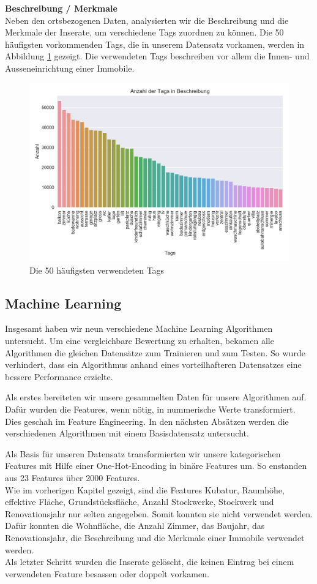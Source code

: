 \textbf{Beschreibung / Merkmale}\\
Neben den ortsbezogenen Daten, analysierten wir die Beschreibung und die Merkmale der Inserate, um verschiedene Tags zuordnen zu können. Die 50 häufigsten vorkommenden Tags, die in unserem Datensatz vorkamen, werden in Abbildung \ref{fig:tags} gezeigt. Die verwendeten Tags beschreiben vor allem die Innen- und Ausseneinrichtung einer Immobile.
%
\begin{figure}[ht]
\centering
\includegraphics[width=\textwidth]{images/tags.png}
\caption[Die 50 häufigsten verwendeten Tags]{Die 50 häufigsten verwendeten Tags}%
\label{fig:tags}
\end{figure}

\subsection{Machine Learning}
Insgesamt haben wir neun verschiedene Machine Learning Algorithmen untersucht. Um eine vergleichbare Bewertung zu erhalten, bekamen alle Algorithmen die gleichen Datensätze zum Trainieren und zum Testen. So wurde verhindert, dass ein Algorithmus anhand eines vorteilhafteren Datensatzes eine bessere Performance erzielte. 

Als erstes bereiteten wir unsere gesammelten Daten für unsere Algorithmen auf. Dafür wurden die Features, wenn nötig, in nummerische Werte transformiert. Dies geschah im Feature Engineering. In den nächsten Absätzen werden die verschiedenen Algorithmen mit einem Basisdatensatz untersucht.

Als Basis für unseren Datensatz transformierten wir unsere kategorischen Features mit Hilfe einer One-Hot-Encoding in binäre Features um. So enstanden aus 23 Features über 2000 Features.\\
Wie im vorherigen Kapitel gezeigt, sind die Features Kubatur, Raumhöhe, effektive Fläche, Grundstücksfläche, Anzahl Stockwerke, Stockwerk und Renovationsjahr nur selten angegeben. Somit konnten sie nicht verwendet werden. Dafür konnten die Wohnfläche, die Anzahl Zimmer, das Baujahr, das Renovationsjahr, die Beschreibung und die Merkmale einer Immobile verwendet werden.\\
Als letzter Schritt wurden die Inserate gelöscht, die keinen Eintrag bei einem verwendeten Feature besassen oder doppelt vorkamen.

